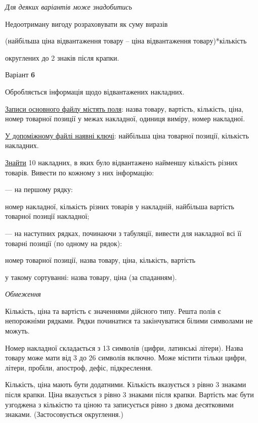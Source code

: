 \documentclass[11pt, ukrainian]{article}
\begin{document}
\bigskip\textit{Для деяких варіантів може знадобитись}

Недоотриману вигоду розраховувати як суму виразів
{\center (найбільша ціна відвантаження товару – ціна відвантаження товару)*кількість\par}

\bigskip
{\noindent} округлених до 2 знаків після крапки.


\par
\newpage
{\center Варіант  \No \textbf { 6 }\par}
\bigskip
Обробляється інформація щодо відвантажених накладних.

\underline{Записи основного файлу містять поля}: назва товару, вартість, кількість, ціна, номер товарної позиції у межах накладної, одиниця виміру, номер накладної.

\underline{У допоміжному файлі наявні ключі}: найбільша ціна товарної позиції, кількість накладних.

\underline{Знайти} 10 накладних, в яких було відвантажено найменшу кількість різних товарів. Вивести по кожному з них інформацію:\par
{\noindent}--- на першому рядку:\par
номер накладної, кількість різних товарів у накладній, найбільша вартість товарної позиції накладної;

{\noindent}--- на наступних рядках, починаючи з табуляції, вивести для накладної всі її товарні позиції (по одному на рядок):\par
номер товарної позиції, назва товару, ціна, кількість, вартість

{\noindent}у такому сортуванні: назва товару, ціна (за спаданням).


\bigskip\textit{Обмеження}

Кількість, ціна та вартість є значеннями дійсного типу.
Решта полів є непорожніми рядками.
Рядки починатися та закінчуватися білими символами не можуть.

Номер накладної складається з 13 символів (цифри, латинські літери).
Назва товару може мати від 3 до 26 символів включно.
Може містити тільки цифри, літери, пробіли, апостроф, дефіс, підкреслення.

Кількість, ціна мають бути додатними.
Кількість вказується з рівно 3 знаками після крапки.
Ціна вказується з рівно 3 знаками після крапки.
Вартість має бути узгоджена з кількістю та ціною та записується рівно з двома десятковими знаками.
(Застосовується округлення.)
\end{document}
